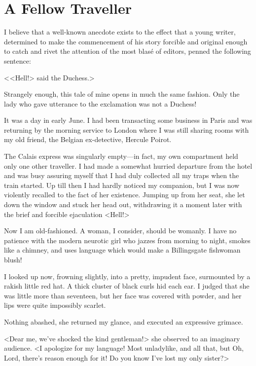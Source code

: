 \chapter{A Fellow Traveller}

\lettrine{I}{} believe that a well-known anecdote exists to the effect that a young writer, determined to make the commencement of his story forcible and original enough to catch and rivet the attention of the most blasé of editors, penned the following sentence: 

 < <Hell!> said the Duchess.> 

 Strangely enough, this tale of mine opens in much the same fashion. Only the lady who gave utterance to the exclamation was not a Duchess! 

 It was a day in early June. I had been transacting some business in Paris and was returning by the morning service to London where I was still sharing rooms with my old friend, the Belgian ex-detective, Hercule Poirot. 

 The Calais express was singularly empty—in fact, my own compartment held only one other traveller. I had made a somewhat hurried departure from the hotel and was busy assuring myself that I had duly collected all my traps when the train started. Up till then I had hardly noticed my companion, but I was now violently recalled to the fact of her existence. Jumping up from her seat, she let down the window and stuck her head out, withdrawing it a moment later with the brief and forcible ejaculation <Hell!> 

 Now I am old-fashioned. A woman, I consider, should be womanly. I have no patience with the modern neurotic girl who jazzes from morning to night, smokes like a chimney, and uses language which would make a Billingsgate fishwoman blush! 

 I looked up now, frowning slightly, into a pretty, impudent face, surmounted by a rakish little red hat. A thick cluster of black curls hid each ear. I judged that she was little more than seventeen, but her face was covered with powder, and her lips were quite impossibly scarlet. 

 Nothing abashed, she returned my glance, and executed an expressive grimace. 

 <Dear me, we've shocked the kind gentleman!> she observed to an imaginary audience. <I apologize for my language! Most unladylike, and all that, but Oh, Lord, there's reason enough for it! Do you know I've lost my only sister?> 

